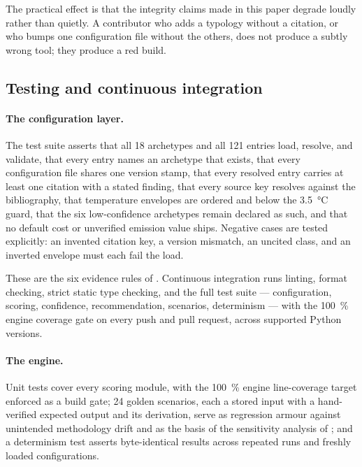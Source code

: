 The practical effect is that the integrity claims made in this paper degrade
loudly rather than quietly. A contributor who adds a typology without a
citation, or who bumps one configuration file without the others, does not
produce a subtly wrong tool; they produce a red build.

\subsection{Testing and continuous integration}
\label{sec:testing}

\paragraph{The configuration layer.} The test suite asserts that all \num{18}
archetypes and all \num{121} entries load, resolve, and validate, that every
entry names an archetype that exists, that every configuration file shares one
version stamp, that every resolved entry carries at least one citation with a
stated finding, that every source key resolves against the bibliography, that
temperature envelopes are ordered and below the \qty{3.5}{\degreeCelsius}
guard, that the six low-confidence archetypes remain declared as such, and that
no default cost or unverified emission value ships. Negative cases are tested
explicitly: an invented citation key, a version mismatch, an uncited class, and
an inverted envelope must each fail the load.

These are the six evidence rules of . Continuous
integration runs linting, format checking, strict static type checking, and the
full test suite --- configuration, scoring, confidence, recommendation,
scenarios, determinism --- with the \SI{100}{\percent} engine coverage gate on
every push and pull request, across supported Python versions.

\paragraph{The engine.} Unit tests cover every scoring module, with the
\SI{100}{\percent} engine line-coverage target enforced as a build gate;
\num{24} golden scenarios, each a stored input with a hand-verified expected
output and its derivation, serve as regression armour against unintended
methodology drift and as the basis of the sensitivity analysis of
; and a determinism test asserts byte-identical
results across repeated runs and freshly loaded configurations.

